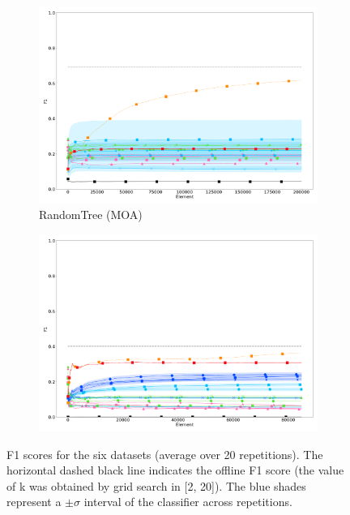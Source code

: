 \begin{figure}
\begin{subfigure}[t]{.49\linewidth}
		\includegraphics[width=\linewidth]{figures/results/dataset_3_f1_std.png}
		\caption{RandomTree (MOA)}
		\label{fig:f1-dataset_3}
	\end{subfigure}
	\begin{subfigure}[t]{.49\linewidth}
		\includegraphics[width=\linewidth]{figures/results/recofit_6_f1_std.png}
		\caption{\recofitdataset}
		\label{fig:f1-recofit}
	\end{subfigure}
	\caption{F1 scores for the six datasets (average over 20 repetitions).
		The horizontal dashed black line indicates the offline \knn F1
		score (the value of k was obtained by grid search in [2, 20]). The
		blue shades represent a $\pm\sigma$ interval of the \mondrianforest
		classifier across repetitions.}
	\label{fig:f1}
\end{figure}

